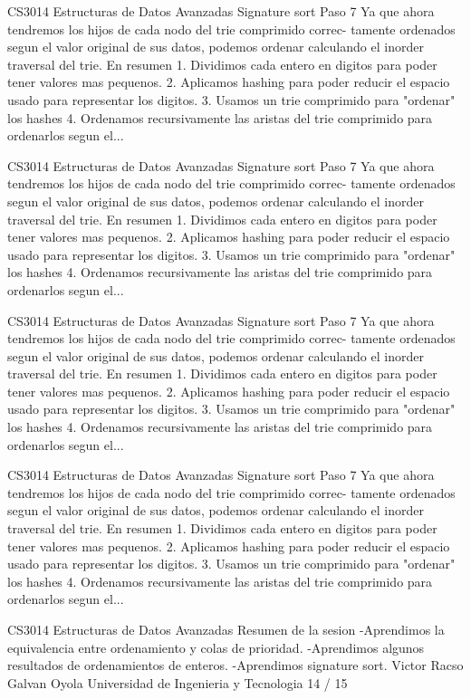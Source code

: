 \begin{description}[leftmargin=!,labelwidth=4.2em,style=nextline]
\item[Pag. 51] CS3014 Estructuras de Datos Avanzadas Signature sort Paso 7 Ya que ahora tendremos los hijos de cada nodo del trie comprimido correc- tamente ordenados segun el valor original de sus datos, podemos ordenar calculando el inorder traversal del trie. En resumen 1. Dividimos cada entero en digitos para poder tener valores mas pequenos. 2. Aplicamos hashing para poder reducir el espacio usado para representar los digitos. 3. Usamos un trie comprimido para "ordenar" los hashes 4. Ordenamos recursivamente las aristas del trie comprimido para ordenarlos segun el...
\item[Pag. 52] CS3014 Estructuras de Datos Avanzadas Signature sort Paso 7 Ya que ahora tendremos los hijos de cada nodo del trie comprimido correc- tamente ordenados segun el valor original de sus datos, podemos ordenar calculando el inorder traversal del trie. En resumen 1. Dividimos cada entero en digitos para poder tener valores mas pequenos. 2. Aplicamos hashing para poder reducir el espacio usado para representar los digitos. 3. Usamos un trie comprimido para "ordenar" los hashes 4. Ordenamos recursivamente las aristas del trie comprimido para ordenarlos segun el...
\item[Pag. 53] CS3014 Estructuras de Datos Avanzadas Signature sort Paso 7 Ya que ahora tendremos los hijos de cada nodo del trie comprimido correc- tamente ordenados segun el valor original de sus datos, podemos ordenar calculando el inorder traversal del trie. En resumen 1. Dividimos cada entero en digitos para poder tener valores mas pequenos. 2. Aplicamos hashing para poder reducir el espacio usado para representar los digitos. 3. Usamos un trie comprimido para "ordenar" los hashes 4. Ordenamos recursivamente las aristas del trie comprimido para ordenarlos segun el...
\item[Pag. 54] CS3014 Estructuras de Datos Avanzadas Signature sort Paso 7 Ya que ahora tendremos los hijos de cada nodo del trie comprimido correc- tamente ordenados segun el valor original de sus datos, podemos ordenar calculando el inorder traversal del trie. En resumen 1. Dividimos cada entero en digitos para poder tener valores mas pequenos. 2. Aplicamos hashing para poder reducir el espacio usado para representar los digitos. 3. Usamos un trie comprimido para "ordenar" los hashes 4. Ordenamos recursivamente las aristas del trie comprimido para ordenarlos segun el...
\item[Pag. 55] CS3014 Estructuras de Datos Avanzadas Resumen de la sesion -Aprendimos la equivalencia entre ordenamiento y colas de prioridad. -Aprendimos algunos resultados de ordenamientos de enteros. -Aprendimos signature sort. Victor Racso Galvan Oyola Universidad de Ingenieria y Tecnologia 14 / 15

\end{description}

